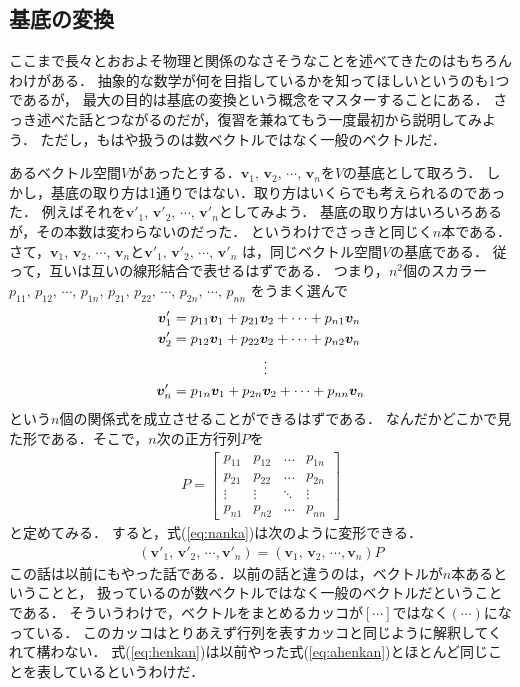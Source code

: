 \subsection{基底の変換}
ここまで長々とおおよそ物理と関係のなさそうなことを述べてきたのはもちろんわけがある．
抽象的な数学が何を目指しているかを知ってほしいというのも1つであるが，
最大の目的は基底の変換という概念をマスターすることにある．
さっき述べた話とつながるのだが，復習を兼ねてもう一度最初から説明してみよう．
ただし，もはや扱うのは数ベクトルではなく一般のベクトルだ．

あるベクトル空間$V$があったとする．$\bm{v}_1, \, \bm{v}_2, \, \cdots , \, \bm{v}_n$を$V$の基底として取ろう．
しかし，基底の取り方は1通りではない．取り方はいくらでも考えられるのであった．
例えばそれを$\bm{v}'_1, \, \bm{v}'_2, \, \cdots , \, \bm{v}'_n$としてみよう．
基底の取り方はいろいろあるが，その本数は変わらないのだった．
というわけでさっきと同じく$n$本である．
さて，$\bm{v}_1, \, \bm{v}_2, \, \cdots , \, \bm{v}_n$と$\bm{v}'_1, \, \bm{v}'_2, \, \cdots , \, \bm{v}'_n$
は，同じベクトル空間$V$の基底である．
従って，互いは互いの線形結合で表せるはずである．
つまり，$n^2$個のスカラー
$p_{11}, \, p_{12}, \, \cdots, \, p_{1n}, \, p_{21}, \, p_{22}, \, \cdots, \, p_{2n}, \, \cdots, \,  p_{nn}$
をうまく選んで
\begin{align}
\begin{aligned}
\bm{v}'_1 & = p_{11} \bm{v}_1 + p_{21} \bm{v}_2 + \cdots + p_{n1} \bm{v}_n \\
\bm{v}'_2 & = p_{12} \bm{v}_1 + p_{22} \bm{v}_2 + \cdots + p_{n2} \bm{v}_n \\
& \hspace{2.3cm }\vdots \\
\bm{v}'_n & = p_{1n} \bm{v}_1 + p_{2n} \bm{v}_2 + \cdots + p_{nn} \bm{v}_n 
\end{aligned}
\label{eq:nanka}
\end{align}
という$n$個の関係式を成立させることができるはずである．
なんだかどこかで見た形である．そこで，$n$次の正方行列$P$を
\begin{align*}
P =
\left[
\begin{array}{cccc}
p_{11} & p_{12} & \ldots & p_{1n} \\
p_{21} & p_{22} & \ldots & p_{2n} \\
\vdots & \vdots & \ddots & \vdots \\
p_{n1} & p_{n2} & \ldots & p_{nn}
\end{array}
\right]
\end{align*}
と定めてみる．
すると，式(\ref{eq:nanka})は次のように変形できる．
\begin{align}
( \bm{v}'_1, \, \bm{v}'_2, \, \cdots, \bm{v}'_n ) = ( \bm{v}_1, \, \bm{v}_2, \, \cdots, \bm{v}_n ) P
\label{eq:henkan}
\end{align}
この話は以前にもやった話である．以前の話と違うのは，ベクトルが$n$本あるということと，
扱っているのが数ベクトルではなく一般のベクトルだということである．
そういうわけで，ベクトルをまとめるカッコが$[ \cdots ]$ではなく$( \cdots )$になっている．
このカッコはとりあえず行列を表すカッコと同じように解釈してくれて構わない．
式(\ref{eq:henkan})は以前やった式(\ref{eq:ahenkan})とほとんど同じことを表しているというわけだ．


